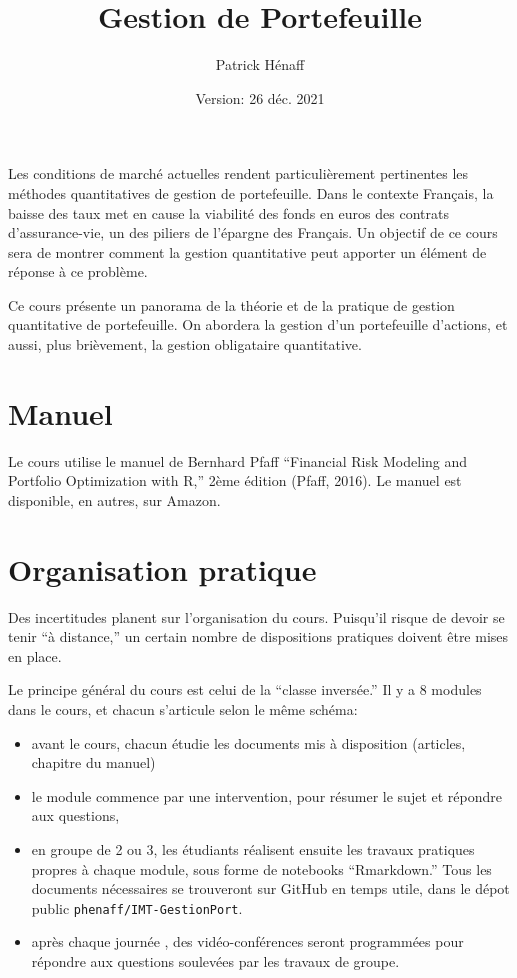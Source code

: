 \documentclass[
  11pt,
]{article}
\title{Gestion de Portefeuille}
\author{Patrick Hénaff}
\date{Version: 26 déc. 2021}
\begin{document}
\maketitle

Les conditions de marché actuelles rendent particulièrement pertinentes
les méthodes quantitatives de gestion de portefeuille. Dans le contexte
Français, la baisse des taux met en cause la viabilité des fonds en
euros des contrats d'assurance-vie, un des piliers de l'épargne des
Français. Un objectif de ce cours sera de montrer comment la gestion
quantitative peut apporter un élément de réponse à ce problème.

Ce cours présente un panorama de la théorie et de la pratique de gestion
quantitative de portefeuille. On abordera la gestion d'un portefeuille
d'actions, et aussi, plus brièvement, la gestion obligataire
quantitative.

\hypertarget{manuel}{%
\section{Manuel}\label{manuel}}

Le cours utilise le manuel de Bernhard Pfaff ``Financial Risk Modeling
and Portfolio Optimization with R,'' 2ème édition (Pfaff, 2016). Le
manuel est disponible, en autres, sur Amazon.

\hypertarget{organisation-pratique}{%
\section{Organisation pratique}\label{organisation-pratique}}

Des incertitudes planent sur l'organisation du cours. Puisqu'il risque
de devoir se tenir ``à distance,'' un certain nombre de dispositions
pratiques doivent être mises en place.

Le principe général du cours est celui de la ``classe inversée.'' Il y a
8 modules dans le cours, et chacun s'articule selon le même schéma:

\begin{itemize}
\item
  avant le cours, chacun étudie les documents mis à disposition
  (articles, chapitre du manuel)
\item
  le module commence par une intervention, pour résumer le sujet et
  répondre aux questions,
\item
  en groupe de 2 ou 3, les étudiants réalisent ensuite les travaux
  pratiques propres à chaque module, sous forme de notebooks
  ``Rmarkdown.'' Tous les documents nécessaires se trouveront sur GitHub
  en temps utile, dans le dépot public \texttt{phenaff/IMT-GestionPort}.
\item
  après chaque journée , des vidéo-conférences seront programmées pour
  répondre aux questions soulevées par les travaux de groupe.
\end{itemize}
\end{document}

